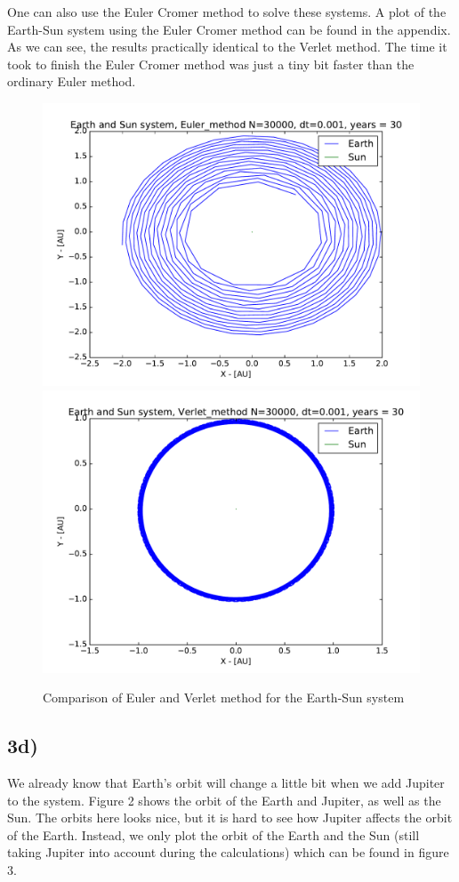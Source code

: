 \documentclass[12pt]{article}
\begin{document}
One can also use the Euler Cromer method to solve these systems. A plot of the Earth-Sun system using the Euler Cromer method can be found in the appendix. As we can see, the results practically identical to the Verlet method. The time it took to finish the Euler Cromer method was just a tiny bit faster than the ordinary Euler method.
\begin{figure}[hbtp]
\centering
\includegraphics[width=\linewidth]{Plots/Earth_Sun_Euler_method.pdf}
\includegraphics[width=\linewidth]{Plots/Earth_Sun_Verlet_method.pdf}
\caption{Comparison of Euler and Verlet method for the Earth-Sun system}
\end{figure}

\subsection*{3d)}
We already know that Earth's orbit will change a little bit when we add Jupiter to the system. Figure 2 shows the orbit of the Earth and Jupiter, as well as the Sun. The orbits here looks nice, but it is hard to see how Jupiter affects the orbit of the Earth. Instead, we only plot the orbit of the Earth and the Sun (still taking Jupiter into account during the calculations) which can be found in figure 3. 
\end{document}

